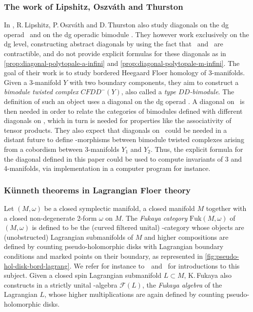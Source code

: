 \documentclass[JEP,XML,SOM,NoFloatCountersInSection,Unicode,published]{cedram}
\theoremstyle{definition}
\theoremstyle{plain}
\begin{document}
\subsubsection{The work of Lipshitz, {Oszváth} and Thurston}

In \cite{LOT20}, R.\,Lipshitz, P.\,\hbox{Oszváth} and D.\,Thurston also study diagonals on the dg operad \Ainf\ and on the dg operadic bimodule \Minf. They however work exclusively on the dg level, constructing abstract diagonals by using the fact that \Ainf\ and \Minf\ are contractible, and do not provide explicit formulas for these diagonals as in \cref{prop:diagonal-polytopale-a-infini} and \cref{prop:diagonal-polytopale-m-infini}. The goal of their work is to study bordered Heegaard Floer homology of 3-manifolds.
Given a 3-manifold $Y$ with two boundary components, they aim to construct a \emph{bimodule twisted complex} $CFDD^-(Y)$, also called a \emph{type $DD$-bimodule}. The definition of such an object uses a diagonal on the dg operad \Ainf. A diagonal on \Minf\ is then needed in order to relate the categories of bimodules defined with different diagonals on \Ainf, which in turn is needed for properties like the associativity of tensor products. They also expect that diagonals on \Minf\ could be needed in a distant future to define \Ainf -morphisms between bimodule twisted complexes arising from a cobordism between 3-manifolds $Y_1$ and $Y_2$.
Thus, the explicit formula for the diagonal defined in this paper could be used to compute invariants of 3 and 4-manifolds, via implementation in a computer program for instance.

\subsubsection{Künneth theorems in Lagrangian Floer theory}
\label{sss:amorim-fukaya}

Let $(M,\omega)$ be a closed symplectic manifold, \ie a closed manifold $M$ together with a closed non-degenerate 2\nobreakdash-form $\omega$ on $M$.
The \emph{Fukaya category} $\mathrm{Fuk}(M,\omega)$ of $(M,\omega)$ is defined to be the (curved filtered unital) \Ainf -category whose objects are (unobstructed) Lagrangian submanifolds of $M$ and higher compositions are defined by counting pseudo-holomorphic disks with Lagrangian boundary conditions and marked points on their boundary, as represented in \cref{fig:pseudo-hol-disk-bord-lagrang}.
We refer for instance to~\cite{smith-prolegomenon}~and~\cite{auroux-fukaya} for introductions to this subject.
Given a closed spin Lagrangian submanifold $L \subset M$, K.\,Fukaya also constructs in \cite{fukaya-cyclic-symmetry} a strictly unital \Ainf -algebra $\mathcal{F}(L)$, the \emph{Fukaya algebra} of the Lagrangian $L$, whose higher multiplications are again defined by counting pseudo-holomorphic disks.
\end{document}
